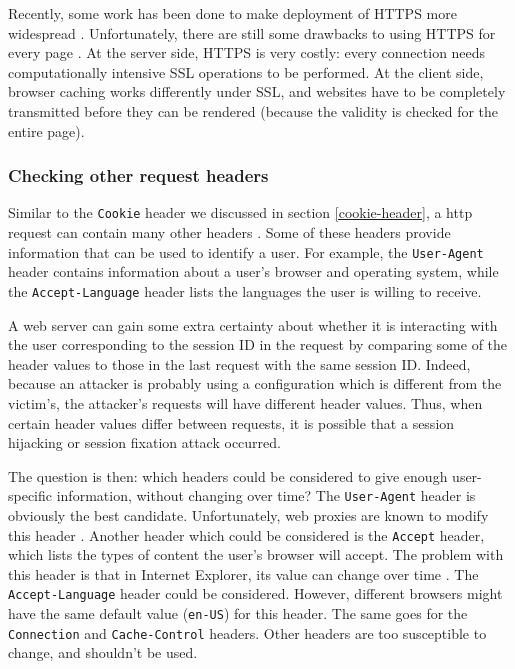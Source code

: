 Recently, some work has been done to make deployment of HTTPS more widespread \cite{Hodges2010,Jackson2008}. Unfortunately, there are still some drawbacks to using HTTPS for every page \cite{Adida2008}. At the server side, HTTPS is very costly: every connection needs computationally intensive SSL operations to be performed. At the client side, browser caching works differently under SSL, and websites have to be completely transmitted before they can be rendered (because the validity is checked for the entire page).

\subsubsection{Checking other request headers}

Similar to the \texttt{Cookie} header we discussed in section \ref{cookie-header}, a \gls{http} request can contain many other headers \cite{rfc2616}. Some of these headers provide information that can be used to identify a user. For example, the \texttt{User-Agent} header contains information about a user's browser and operating system, while the \texttt{Accept-Language} header lists the languages the user is willing to receive.

A web server can gain some extra certainty about whether it is interacting with the user corresponding to the session ID in the request by comparing some of the header values to those in the last request with the same session ID. Indeed, because an attacker is probably using a configuration which is different from the victim's, the attacker's requests will have different header values. Thus, when certain header values differ between requests, it is possible that a session hijacking or session fixation attack occurred.

The question is then: which headers could be considered to give enough user-specific information, without changing over time? The \texttt{User-Agent} header is obviously the best candidate. Unfortunately, web proxies are known to modify this header \cite{ShiflettHijacking}. Another header which could be considered is the \texttt{Accept} header, which lists the types of content the user's browser will accept. The problem with this header is that in Internet Explorer, its value can change over time \cite{ShiflettHijacking}. The \texttt{Accept-Language} header could be considered. However, different browsers might have the same default value (\texttt{en-US}) for this header. The same goes for the \texttt{Connection} and \texttt{Cache-Control} headers. Other headers are too susceptible to change, and shouldn't be used.

